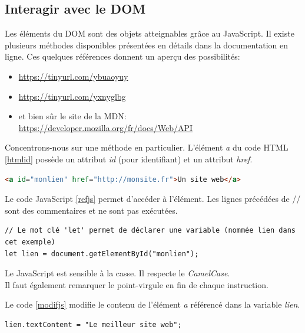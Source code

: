 \documentclass[a4paper,11pt]{article}
\begin{document}
\begin{Form}
\subsection{Interagir avec le DOM}
Les éléments du DOM sont des objets atteignables grâce au JavaScript. Il existe plusieurs méthodes disponibles présentées en détails dans la documentation en ligne. Ces quelques références donnent un aperçu des possibilités:
\begin{itemize}
\item \url{https://tinyurl.com/ybuaoyuy}
\item \url{https://tinyurl.com/yxnyglbg}
\item et bien sûr le site de la MDN: \url{https://developer.mozilla.org/fr/docs/Web/API}
\end{itemize}
Concentrons-nous sur une méthode en particulier. L'élément \emph{a} du code HTML \ref{htmlid} possède un attribut \emph{id} (pour identifiant) et un attribut \emph{href}.
\begin{code}[!h]
\begin{lstlisting}[language=HTML]
<a id="monlien" href="http://monsite.fr">Un site web</a>
\end{lstlisting}
\label{htmlid}
\end{code}

Le code JavaScript \ref{refjs} permet d'accéder à l'élément. Les lignes précédées de // sont des commentaires et ne sont pas exécutées.
\begin{code}[!h]
\begin{lstlisting}
// Le mot clé 'let' permet de déclarer une variable (nommée lien dans cet exemple)
let lien = document.getElementById("monlien");
\end{lstlisting}
\label{refjs}
\end{code}
\begin{aretenir}[Remarque]
Le JavaScript est sensible à la casse. Il respecte le \emph{CamelCase}.\\
Il faut également remarquer le point-virgule en fin de chaque instruction.
\end{aretenir}

Le code \ref{modifjs} modifie le contenu de l'élément \emph{a} référencé  dans la variable \emph{lien}.

\begin{code}[!h]
\begin{lstlisting}
lien.textContent = "Le meilleur site web";
\end{lstlisting}
\label{modifjs}
\end{code}


\end{Form}
\end{document}

